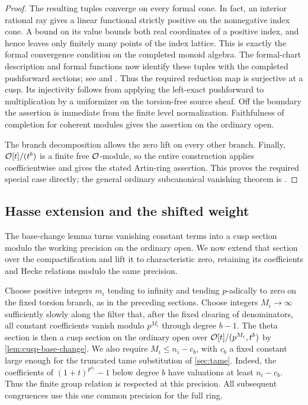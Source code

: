 \begin{proof}
The resulting tuples converge on every formal cone.  In fact, an
interior rational ray gives a linear functional strictly positive
on the nonnegative index cone.  A bound on its value bounds both
real coordinates of a positive index, and hence leaves only
finitely many points of the index lattice.  This is exactly the
formal convergence condition on the completed monoid algebra.
The formal-chart description and formal functions now identify
these tuples with the completed pushforward sections; see
\citet[Section~7.1.2]{Lan2013} and
\citet[Chapter~III, Theorem~11.1]{Hartshorne1977}.
Thus the required reduction map is surjective at a cusp.  Its
injectivity follows from applying the left-exact pushforward to
multiplication by a uniformizer on the torsion-free source sheaf.
Off the boundary the assertion is immediate from the finite level
normalization.  Faithfulness of completion for coherent modules
gives the assertion on the ordinary open.

The branch decomposition allows the zero lift on every other
branch.  Finally, $\mathcal O[t]/(t^b)$ is a finite free $\mathcal O$-module, so
the entire construction applies coefficientwise and gives the
stated Artin-ring assertion.
This proves the required special case directly; the general ordinary
subcanonical vanishing theorem is
\citet[Theorem~8.2.1.3, with the setup of Section~8.1]{Lan2018Ordinary}.
\end{proof}

\subsection{Hasse extension and the shifted weight}

The base-change lemma turns vanishing constant terms into a cusp
section modulo the working precision on the ordinary open.  We now
extend that section over the compactification and lift it to
characteristic zero, retaining its coefficients and Hecke relations
modulo the same precision.

Choose positive integers $m_i$ tending to infinity and tending
$p$-adically to zero on the fixed torsion branch, as in the preceding
sections.  Choose integers $M_i\to\infty$ sufficiently slowly along
the filter that, after the fixed clearing of denominators, all
constant coefficients vanish modulo $p^{M_i}$ through degree
$b-1$.  The theta section is then a cusp section on the ordinary
open over $\mathcal O[t]/(p^{M_i},t^b)$ by
\cref{lem:cusp-base-change}.
We also require $M_i\leq n_i-c_b$, with $c_b$ a fixed constant
large enough for the truncated tame substitution of
\cref{sec:tame}.  Indeed, the coefficients of
$(1+t)^{p^{n_i}}-1$ below degree $b$ have valuations at least
$n_i-c_b$.  Thus the finite group relation is respected at this
precision.  All subsequent congruences use this one common
precision for the full ring.

